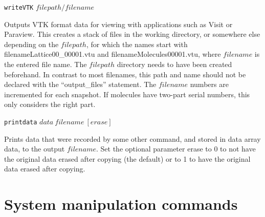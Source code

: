 \documentclass {scrbook}
\newcommand {\ttt} {\texttt}
\begin{document}
\begin{description}
\item{\ttt{writeVTK} $filepath/filename$}

Outputs VTK format data for viewing with applications such as Visit or Paraview. This creates a stack of files in the working directory, or somewhere else depending on the $filepath$, for which the names start with filenameLattice00\_00001.vtu and filenameMolecules00001.vtu, where $filename$ is the entered file name. The $filepath$ directory needs to have been created beforehand. In contrast to most filenames, this path and name should not be declared with the ``output\_files'' statement. The $filename$ numbers are incremented for each snapshot. If molecules have two-part serial numbers, this only considers the right part.

\item{\ttt{printdata} $data\ filename\ [erase]$}

Prints data that were recorded by some other command, and stored in data array data, to the output $filename$. Set the optional parameter erase to 0 to not have the original data erased after copying (the default) or to 1 to have the original data erased after copying.

\end{description}

\section{System manipulation commands}
\end{document}
